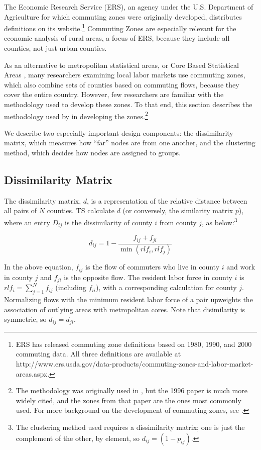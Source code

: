 The Economic Research Service (ERS), an agency under the U.S. Department of Agriculture for which commuting zones were originally developed, distributes definitions on its website.\footnote{ERS has released commuting zone definitions based on 1980, 1990, and 2000 commuting data. All three definitions are available at http://www.ers.usda.gov/data-products/commuting-zones-and-labor-market-areas.aspx.} Commuting Zones are especially relevant for the economic analysis of rural areas, a focus of ERS, because they include all counties, not just urban counties.

As an alternative to metropolitan statistical areas, or Core Based Statistical Areas \citep{OMB2013}, many researchers examining local labor markets use commuting zones, which also combine sets of counties based on commuting flows, because they cover the entire country. However, few researchers are familiar with the methodology used to develop these zones. To that end, this section describes the methodology used by \cite{TS1996} in developing the zones.\footnote{The methodology was originally used in \cite{TK1987}, but the 1996 paper is much more
widely cited, and the zones from that paper are the ones most commonly used. For more background on the development of commuting zones, see \cite{FowlerRhubartJensen2016}.}

We describe two especially important design components: the dissimilarity matrix, which measures how ``far'' nodes are from one another, and the clustering method, which decides how nodes are assigned to groups.

\subsection{Dissimilarity Matrix}

The dissimilarity matrix, $d$, is a representation of the relative distance between all pairs of $N$ counties. TS calculate $d$ (or conversely, the similarity matrix $p$), where an entry $D_{ij}$ is the dissimilarity of county $i$ from county $j$, as below:\footnote{The clustering method used requires a dissimilarity matrix; one is just the complement of the other, by element, so $d_{ij}=(1-p_{ij})$.}

\begin{equation}\label{eqn:diss}
d_{ij} = 1- \frac{f_{ij}+f_{ji}}{\min(rlf_{i},rlf_j)}
\end{equation}

In the above equation, $f_{ij}$ is the flow of commuters who live in county $i$ and work in county $j$ and $f_{ji}$ is the opposite flow. The resident labor force in county $i$ is $rlf_i = \sum_{j=1}^{N} f_{ij}$ (including $f_{ii}$), with a corresponding calculation for county $j$. Normalizing flows with the minimum resident labor force of a pair upweights the association of outlying areas with metropolitan cores. Note that disimilarity is symmetric, so $d_{ij}=d_{ji}$.

